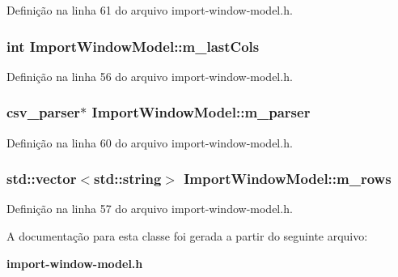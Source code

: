 Definição na linha 61 do arquivo import-\/window-\/model.\+h.

\subsubsection[{m\+\_\+last\+Cols}]{\setlength{\rightskip}{0pt plus 5cm}int Import\+Window\+Model\+::m\+\_\+last\+Cols\hspace{0.3cm}{\ttfamily [protected]}}\label{class_import_window_model_a0202bdcfa6aa15d7fb2c0e08f2b8480d}


Definição na linha 56 do arquivo import-\/window-\/model.\+h.

\subsubsection[{m\+\_\+parser}]{\setlength{\rightskip}{0pt plus 5cm}csv\+\_\+parser$\ast$ Import\+Window\+Model\+::m\+\_\+parser\hspace{0.3cm}{\ttfamily [protected]}}\label{class_import_window_model_a34c198a55b69959ebb6e60e654107cca}


Definição na linha 60 do arquivo import-\/window-\/model.\+h.

\subsubsection[{m\+\_\+rows}]{\setlength{\rightskip}{0pt plus 5cm}std\+::vector$<$std\+::string$>$ Import\+Window\+Model\+::m\+\_\+rows\hspace{0.3cm}{\ttfamily [protected]}}\label{class_import_window_model_af441fbb16e2ee68c01736bf99555ff3a}


Definição na linha 57 do arquivo import-\/window-\/model.\+h.



A documentação para esta classe foi gerada a partir do seguinte arquivo\+:\begin{DoxyCompactItemize}
\item 
{\bf import-\/window-\/model.\+h}\end{DoxyCompactItemize}
